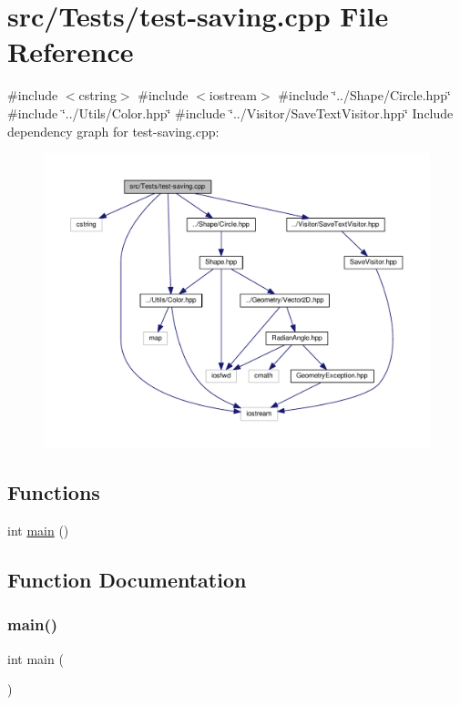 \hypertarget{test-saving_8cpp}{}\section{src/\+Tests/test-\/saving.cpp File Reference}
\label{test-saving_8cpp}
{\ttfamily \#include $<$cstring$>$}\newline
{\ttfamily \#include $<$iostream$>$}\newline
{\ttfamily \#include \char`\"{}../\+Shape/\+Circle.\+hpp\char`\"{}}\newline
{\ttfamily \#include \char`\"{}../\+Utils/\+Color.\+hpp\char`\"{}}\newline
{\ttfamily \#include \char`\"{}../\+Visitor/\+Save\+Text\+Visitor.\+hpp\char`\"{}}\newline
Include dependency graph for test-\/saving.cpp\+:\nopagebreak
\begin{figure}[H]
\begin{center}
\leavevmode
\includegraphics[width=350pt]{test-saving_8cpp__incl}
\end{center}
\end{figure}
\subsection*{Functions}
\begin{DoxyCompactItemize}
\item 
int \hyperlink{test-saving_8cpp_ae66f6b31b5ad750f1fe042a706a4e3d4}{main} ()
\end{DoxyCompactItemize}


\subsection{Function Documentation}
\hypertarget{test-saving_8cpp_ae66f6b31b5ad750f1fe042a706a4e3d4}{}\label{test-saving_8cpp_ae66f6b31b5ad750f1fe042a706a4e3d4} 
\subsubsection{\texorpdfstring{main()}{main()}}
{\footnotesize\ttfamily int main (\begin{DoxyParamCaption}{ }\end{DoxyParamCaption})}

